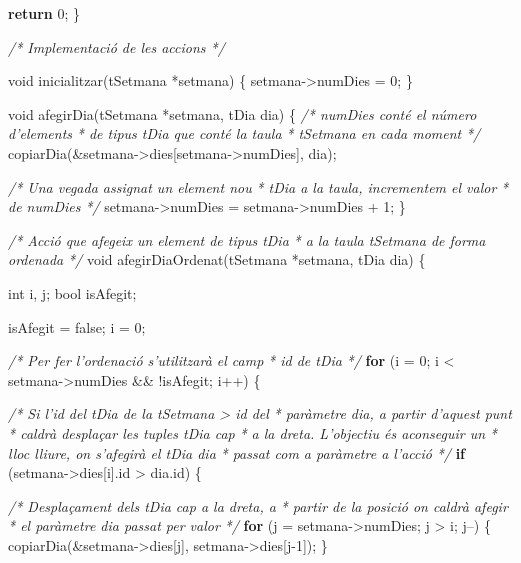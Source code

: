 \documentclass[]{book}
\newenvironment{Shaded}{\begin{snugshade}}{\end{snugshade}}
\newcommand{\DataTypeTok}[1]{\textcolor[rgb]{0.13,0.29,0.53}{#1}}
\newcommand{\DecValTok}[1]{\textcolor[rgb]{0.00,0.00,0.81}{#1}}
\newcommand{\CommentTok}[1]{\textcolor[rgb]{0.56,0.35,0.01}{\textit{#1}}}
\newcommand{\ControlFlowTok}[1]{\textcolor[rgb]{0.13,0.29,0.53}{\textbf{#1}}}
\newcommand{\NormalTok}[1]{#1}
\begin{document}
\begin{Shaded}
\begin{Highlighting}[]
    \ControlFlowTok{return} \DecValTok{0}\NormalTok{;}
\NormalTok{\}}

\CommentTok{/* Implementació de les accions */}

\DataTypeTok{void}\NormalTok{ inicialitzar(tSetmana *setmana) \{}
\NormalTok{    setmana->numDies = }\DecValTok{0}\NormalTok{;}
\NormalTok{\}}

\DataTypeTok{void}\NormalTok{ afegirDia(tSetmana *setmana, tDia dia) \{}
    \CommentTok{/* numDies conté el número d'elements }
\CommentTok{     * de tipus tDia que conté la taula }
\CommentTok{     * tSetmana en cada moment }
\CommentTok{     */}
\NormalTok{    copiarDia(&setmana->dies[setmana->numDies], dia);}

    \CommentTok{/* Una vegada assignat un element nou }
\CommentTok{     * tDia a la taula, incrementem el valor }
\CommentTok{     * de numDies }
\CommentTok{     */}
\NormalTok{    setmana->numDies = setmana->numDies + }\DecValTok{1}\NormalTok{;}
\NormalTok{\}}

\CommentTok{/* Acció que afegeix un element de tipus tDia}
\CommentTok{ * a la taula tSetmana de forma ordenada }
\CommentTok{ */}
\DataTypeTok{void}\NormalTok{ afegirDiaOrdenat(tSetmana *setmana, tDia dia) \{}
    
    \DataTypeTok{int}\NormalTok{ i, j;}
\NormalTok{    bool isAfegit;}
    
\NormalTok{    isAfegit = false;}
\NormalTok{    i = }\DecValTok{0}\NormalTok{;}
    
    \CommentTok{/* Per fer l'ordenació s'utilitzarà el camp}
\CommentTok{     * id de tDia }
\CommentTok{     */}
    \ControlFlowTok{for}\NormalTok{ (i = }\DecValTok{0}\NormalTok{; i < setmana->numDies && !isAfegit; i++) \{}
        
        \CommentTok{/* Si l'id del tDia de la tSetmana > id del}
\CommentTok{         * paràmetre dia, a partir d'aquest punt }
\CommentTok{         * caldrà desplaçar les tuples tDia cap }
\CommentTok{         * a la dreta. L'objectiu és aconseguir un}
\CommentTok{         * lloc lliure, on s'afegirà el tDia dia }
\CommentTok{         * passat com a paràmetre a l'acció}
\CommentTok{         */}
        \ControlFlowTok{if}\NormalTok{ (setmana->dies[i].id > dia.id) \{}
            
            \CommentTok{/* Desplaçament dels tDia cap a la dreta, a}
\CommentTok{             * partir de la posició on caldrà afegir }
\CommentTok{             * el paràmetre dia passat per valor }
\CommentTok{             */}
            \ControlFlowTok{for}\NormalTok{ (j = setmana->numDies; j > i; j--) \{}
\NormalTok{                copiarDia(&setmana->dies[j], setmana->dies[j-}\DecValTok{1}\NormalTok{]);    }
\NormalTok{            \}}
            

\end{Highlighting}
\end{Shaded}
\end{document}
